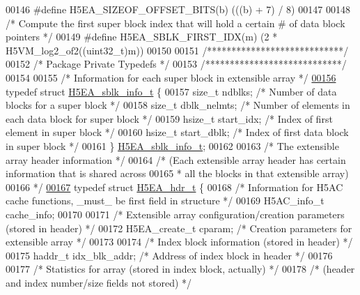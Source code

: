 \begin{DoxyCode}
00146 \textcolor{preprocessor}{#define H5EA\_SIZEOF\_OFFSET\_BITS(b)      (((b) + 7) / 8)}
00147 
00148 \textcolor{comment}{/* Compute the first super block index that will hold a certain # of data block pointers */}
00149 \textcolor{preprocessor}{#define H5EA\_SBLK\_FIRST\_IDX(m)          (2 * H5VM\_log2\_of2((uint32\_t)m))}
00150 
00151 \textcolor{comment}{/****************************/}
00152 \textcolor{comment}{/* Package Private Typedefs */}
00153 \textcolor{comment}{/****************************/}
00154 
00155 \textcolor{comment}{/* Information for each super block in extensible array */}
\hyperlink{struct_h5_e_a__sblk__info__t}{00156} \textcolor{keyword}{typedef} \textcolor{keyword}{struct }\hyperlink{struct_h5_e_a__sblk__info__t}{H5EA\_sblk\_info\_t} \{
00157     \textcolor{keywordtype}{size\_t} ndblks;              \textcolor{comment}{/* Number of data blocks for a super block */}
00158     \textcolor{keywordtype}{size\_t} dblk\_nelmts;         \textcolor{comment}{/* Number of elements in each data block for super block */}
00159     hsize\_t start\_idx;          \textcolor{comment}{/* Index of first element in super block */}
00160     hsize\_t start\_dblk;         \textcolor{comment}{/* Index of first data block in super block */}
00161 \} \hyperlink{struct_h5_e_a__sblk__info__t}{H5EA\_sblk\_info\_t};
00162 
00163 \textcolor{comment}{/* The extensible array header information */}
00164 \textcolor{comment}{/* (Each extensible array header has certain information that is shared across}
00165 \textcolor{comment}{ * all the blocks in that extensible array)}
00166 \textcolor{comment}{ */}
\hyperlink{struct_h5_e_a__hdr__t}{00167} \textcolor{keyword}{typedef} \textcolor{keyword}{struct }\hyperlink{struct_h5_e_a__hdr__t}{H5EA\_hdr\_t} \{
00168     \textcolor{comment}{/* Information for H5AC cache functions, \_must\_ be first field in structure */}
00169     H5AC\_info\_t cache\_info;
00170 
00171     \textcolor{comment}{/* Extensible array configuration/creation parameters (stored in header) */}
00172     H5EA\_create\_t cparam;               \textcolor{comment}{/* Creation parameters for extensible array */}
00173 
00174     \textcolor{comment}{/* Index block information (stored in header) */}
00175     haddr\_t idx\_blk\_addr;               \textcolor{comment}{/* Address of index block in header */}
00176 
00177     \textcolor{comment}{/* Statistics for array (stored in index block, actually) */}
00178     \textcolor{comment}{/* (header and index number/size fields not stored) */}

\end{DoxyCode}
